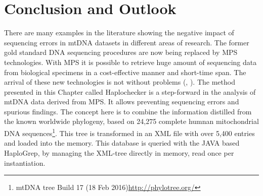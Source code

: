 \section{Conclusion and Outlook}\label{cont:outlook}
There are many examples in the literature showing the negative impact of sequencing errors in mtDNA datasets in different areas of research. The former gold standard DNA sequencing procedures are now being replaced by MPS technologies. With MPS it is possible to retrieve huge amount of sequencing data from biological specimens in a cost-effective manner and short-time span. The arrival of these new technologies is not without problems (\cite{Bandelt2012a}, \cite{Just2015}). The method presented in this Chapter called Haplochecker is a step-forward in the analysis of mtDNA data derived from MPS. It allows preventing sequencing errors and spurious findings. The concept here is to combine the information distilled from the known worldwide phylogeny, based on 24,275 complete humnan mitochondrial DNA sequences\footnote{mtDNA tree Build 17 (18 Feb 2016)\url{http://phylotree.org/}}. This tree is transformed in an XML file with over 5,400 entries and loaded into the memory. This database is queried with the JAVA based HaploGrep, by managing the XML-tree directly in memory, read once per instantiation. 

